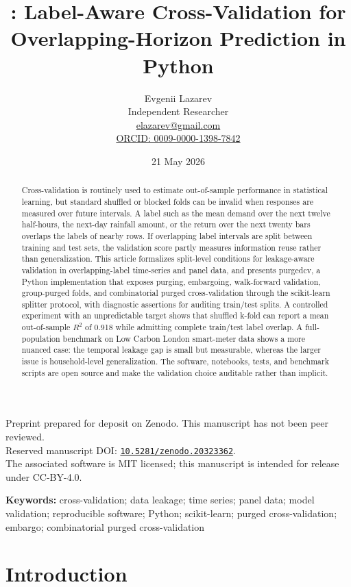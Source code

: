 \documentclass[11pt]{article}
\title{\pcv: Label-Aware Cross-Validation for Overlapping-Horizon Prediction in Python}
\author{Evgenii Lazarev\\Independent Researcher\\\href{mailto:elazarev@gmail.com}{elazarev@gmail.com}\\\href{https://orcid.org/0009-0000-1398-7842}{ORCID: 0009-0000-1398-7842}}
\date{21 May 2026}
\newcommand{\pcv}{\textsf{purgedcv}}
\newcommand{\pkg}[1]{\textsf{#1}}
\newcommand{\doi}[1]{\href{https://doi.org/#1}{\nolinkurl{#1}}}
\begin{document}
\maketitle

\begin{center}
\small
Preprint prepared for deposit on Zenodo. This manuscript has not been peer reviewed.\\
Reserved manuscript DOI: \doi{10.5281/zenodo.20323362}.\\
The associated software is MIT licensed; this manuscript is intended for release under CC-BY-4.0.
\end{center}

\begin{abstract}
Cross-validation is routinely used to estimate out-of-sample performance in
statistical learning, but standard shuffled or blocked folds can be invalid when
responses are measured over future intervals. A label such as the mean demand
over the next twelve half-hours, the next-day rainfall amount, or the return
over the next twenty bars overlaps the labels of nearby rows. If overlapping
label intervals are split between training and test sets, the validation score
partly measures information reuse rather than generalization. This article
formalizes split-level conditions for leakage-aware validation in
overlapping-label time-series and panel data, and presents \pcv, a Python
implementation that exposes purging, embargoing, walk-forward validation,
group-purged folds, and combinatorial purged cross-validation through the
\pkg{scikit-learn} splitter protocol, with diagnostic assertions for auditing
train/test splits. A controlled
experiment with an unpredictable target shows that shuffled k-fold can report a
mean out-of-sample $R^2$ of 0.918 while admitting complete train/test label
overlap. A full-population benchmark on Low Carbon London smart-meter data shows
a more nuanced case: the temporal leakage gap is small but measurable, whereas
the larger issue is household-level generalization. The software, notebooks,
tests, and benchmark scripts are open source and make the validation choice
auditable rather than implicit.
\end{abstract}

\noindent\textbf{Keywords:} cross-validation; data leakage; time series; panel
data; model validation; reproducible software; Python; scikit-learn; purged
cross-validation; embargo; combinatorial purged cross-validation

\section{Introduction}
\end{document}
